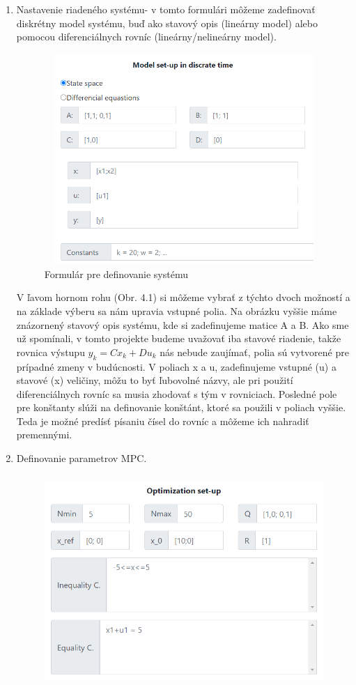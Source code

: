 \begin{enumerate}
\item {Nastavenie riadeného systému- v tomto formulári môžeme zadefinovať diskrétny model systému, buď ako stavový opis (lineárny model) alebo pomocou diferenciálnych rovníc (lineárny/nelineárny model).
\begin{figure}[H]	
	\centering
	\includegraphics[width=11cm,height=8cm]{images/Model_setup}
	\caption{Formulár pre definovanie systému}
\end{figure}
V ľavom hornom rohu (Obr. 4.1) si môžeme vybrať z týchto dvoch možností a na základe výberu sa nám upravia vstupné polia. Na obrázku vyššie máme znázornený stavový opis systému, kde si zadefinujeme matice A a B. Ako sme už spomínali, v tomto projekte budeme uvažovať iba stavové riadenie, takže rovnica výstupu $y_{k} = Cx_{k} + Du_{k}$ nás nebude zaujímať, polia sú vytvorené pre prípadné zmeny v budúcnosti. V poliach x a u, zadefinujeme vstupné (u) a stavové (x) veličiny, môžu to byť ľubovolné názvy, ale pri použití diferenciálnych rovníc sa musia zhodovať s tým v rovniciach. Posledné pole pre konštanty slúži na definovanie konštánt, ktoré sa použili v poliach vyššie. Teda je možné predísť písaniu čísel do rovníc a môžeme ich nahradiť premennými. 
}
\item {Definovanie parametrov MPC.
\begin{figure}[H]	
	\centering
	\includegraphics[width=11cm,height=8cm]{images/MPC_setup}

\end{figure}}
\end{enumerate}
